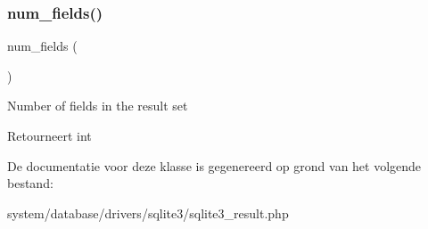\subsubsection{\texorpdfstring{num\_fields()}{num\_fields()}}
{\footnotesize\ttfamily num\+\_\+fields (\begin{DoxyParamCaption}{ }\end{DoxyParamCaption})}

Number of fields in the result set

\begin{DoxyReturn}{Retourneert}
int 
\end{DoxyReturn}


De documentatie voor deze klasse is gegenereerd op grond van het volgende bestand\+:\begin{DoxyCompactItemize}
\item 
system/database/drivers/sqlite3/sqlite3\+\_\+result.\+php\end{DoxyCompactItemize}
